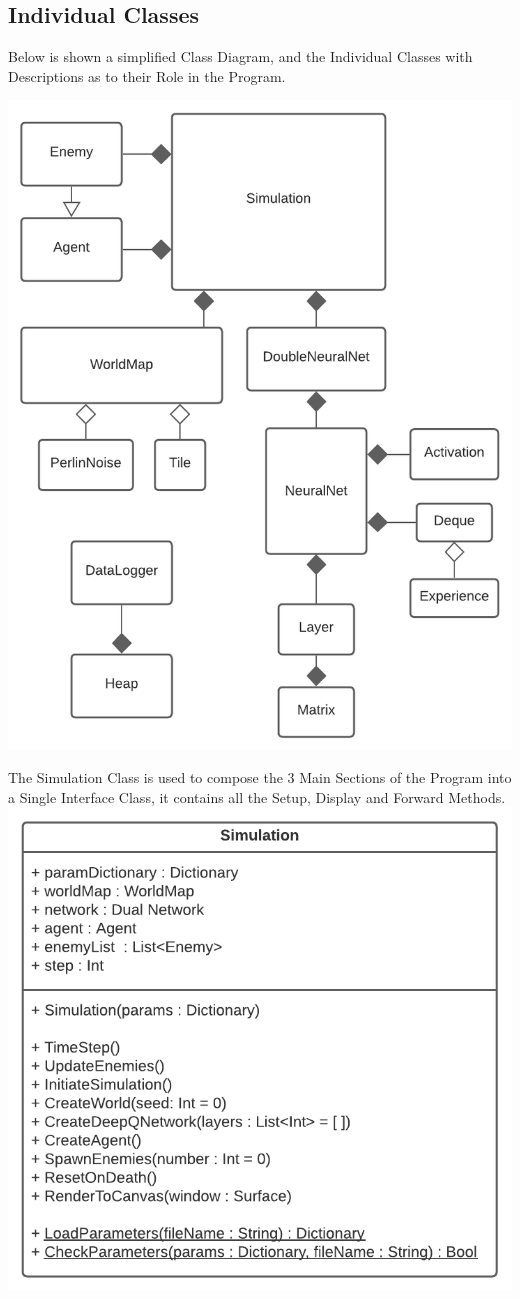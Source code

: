 \begin{flushleft}
        \subsection{Individual Classes}
            Below is shown a simplified Class Diagram, and the Individual Classes with Descriptions as to their Role in the Program. \\
            \centerline{\includegraphics[width=.65\textwidth]{Images/Design/SimplifiedClassDiagram.png}}
            \vspace{0.5cm}

            \begin{center}
                The Simulation Class is used to compose the 3 Main Sections of the Program into a Single Interface Class, it contains all the 
                Setup, Display and Forward Methods. \\
                \includegraphics[width=.6\textwidth]{Images/Design/Classes/Simulation.png} \\
                \vspace{0.2cm}
                

\end{center}
\end{flushleft}
